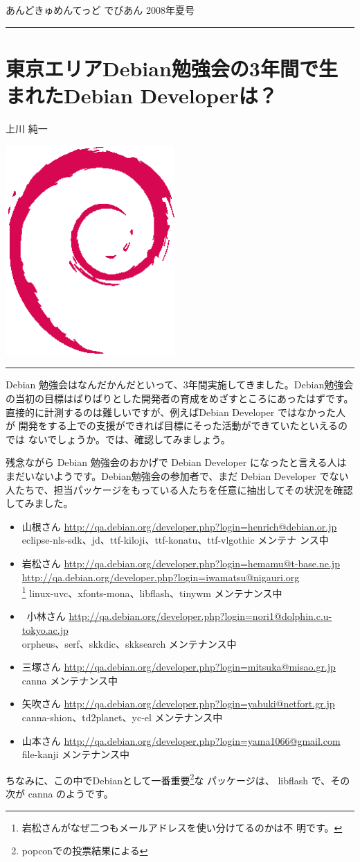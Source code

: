 \documentclass[mingoth,a4paper]{jsarticle}
\renewcommand{\dancersection}[2]{%
\newpage
あんどきゅめんてっど でびあん 2008年夏号
%
\vspace{0.1mm}\\
{\color{dancerlightblue}\rule{\hsize}{2mm}}

%
%
\begin{minipage}[t]{0.6\hsize}
\color{dancerdarkblue}
\vspace{1cm}
\section{#1}
\hfill{}#2\\
\end{minipage}
\begin{minipage}[t]{0.4\hsize}
\vspace{-2cm}
\hfill{}\includegraphics[height=8cm]{image200502/openlogo-nd.eps}\\
\vspace{-5cm}
\end{minipage}
%
%
{\color{dancerdarkblue}\rule{0.74\hsize}{2mm}}
%
\vspace{2cm}
}
\begin{document}
\clearpage 
\dancersection{東京エリアDebian勉強会の3年間で生まれたDebian
Developerは？}{上川 純一}
\label{sec:debmtg2007-3yearsummary}

Debian 勉強会はなんだかんだといって、3年間実施してきました。Debian勉強会
の当初の目標はばりばりとした開発者の育成をめざすところにあったはずです。
直接的に計測するのは難しいですが、例えばDebian Developer ではなかった人が
開発をする上での支援ができれば目標にそった活動ができていたといえるのでは
ないでしょうか。では、確認してみましょう。

残念ながら Debian 勉強会のおかげで Debian Developer になったと言える人は
まだいないようです。Debian勉強会の参加者で、まだ Debian Developer でない
人たちで、担当パッケージをもっている人たちを任意に抽出してその状況を確認
してみました。

\begin{itemize}
 \item
      山根さん
      \url{http://qa.debian.org/developer.php?login=henrich@debian.or.jp} \\
      eclipse-nls-sdk、jd、ttf-kiloji、ttf-konatu、ttf-vlgothic メンテナ
      ンス中
 \item
      岩松さん
      \url{http://qa.debian.org/developer.php?login=hemamu@t-base.ne.jp}
      \url{http://qa.debian.org/developer.php?login=iwamatsu@nigauri.org} \\
      \footnote{岩松さんがなぜ二つもメールアドレスを使い分けてるのかは不
      明です。}
      linux-uvc、xfonts-mona、libflash、tinywm メンテナンス中
 \item
 \     小林さん
      \url{http://qa.debian.org/developer.php?login=nori1@dolphin.c.u-tokyo.ac.jp} \\
      orpheus、serf、skkdic、skksearch メンテナンス中
 \item
      三塚さん
      \url{http://qa.debian.org/developer.php?login=mitsuka@misao.gr.jp} \\
      canna メンテナンス中
 \item
      矢吹さん
      \url{http://qa.debian.org/developer.php?login=yabuki@netfort.gr.jp} \\
      canna-shion、td2planet、yc-el メンテナンス中
 \item
      山本さん
      \url{http://qa.debian.org/developer.php?login=yama1066@gmail.com} \\
      file-kanji メンテナンス中
\end{itemize}

ちなみに、この中でDebianとして一番重要\footnote{popconでの投票結果による}な
パッケージは、 libflash で、その次が canna のようです。
\end{document}
